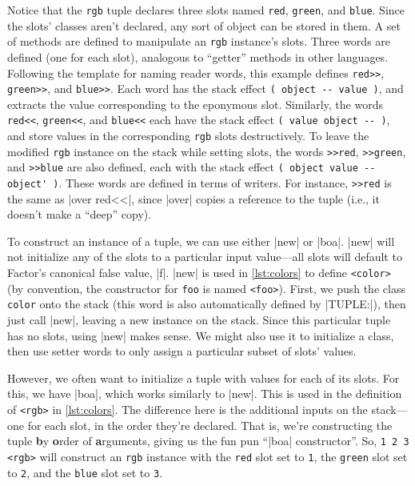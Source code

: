 Notice that the \Verb|rgb| tuple declares three slots named \Verb|red|,
\Verb|green|, and \Verb|blue|.  Since the slots' classes aren't declared,
any sort of object can be stored in them.  A set of methods are defined to
manipulate an \Verb|rgb| instance's slots.  Three  words are
defined (one for each slot), analogous to ``getter'' methods in other
languages.  Following the template for naming reader words, this example
defines \Verb|red>>|, \Verb|green>>|, and \Verb|blue>>|.  Each word has
the stack effect
%
\Verb|( object -- value )|,
%
and extracts the value corresponding to the eponymous slot.  Similarly, the
 words \Verb|red<<|, \Verb|green<<|, and \Verb|blue<<| each
have the stack effect
%
\Verb|( value object -- )|,
%
and store values in the corresponding \Verb|rgb| slots destructively.  To
leave the modified \Verb|rgb| instance on the stack while setting slots, the
 words \Verb|>>red|, \Verb|>>green|, and \Verb|>>blue| are
also defined, each with the stack effect
%
\Verb|( object value -- object' )|.
%
These words are defined in terms of writers.  For instance, \Verb|>>red| is
the same as \factor|over red<<|, since \factor|over| copies a reference to the
tuple (i.e., it doesn't make a ``deep'' copy).

To construct an instance of a tuple, we can use either \factor|new| or
\factor|boa|.  \factor|new| will not initialize any of the slots to a
particular input value---all slots will default to Factor's canonical false
value, \factor|f|.  \factor|new| is used in \vref{lst:colors} to define
\Verb|<color>| (by convention, the constructor for \Verb|foo| is named
\Verb|<foo>|).  First, we push the class \Verb|color| onto the stack (this
word is also automatically defined by \factor|TUPLE:|), then just call
\factor|new|, leaving a new instance on the stack.  Since this particular tuple
has no slots, using \factor|new| makes sense.  We might also use it to
initialize a class, then use setter words to only assign a particular subset of
slots' values.

However, we often want to initialize a tuple with values for each of its slots.
For this, we have \factor|boa|, which works similarly to \factor|new|.  This is
used in the definition of \Verb|<rgb>| in \vref{lst:colors}.  The difference
here is the additional inputs on the stack---one for each slot, in the order
they're declared.  That is, we're constructing the tuple \textbf{b}y
\textbf{o}rder of \textbf{a}rguments, giving us the fun pun ``\factor|boa|
constructor''.  So, \Verb|1 2 3 <rgb>| will construct an \Verb|rgb|
instance with the \Verb|red| slot set to \Verb|1|, the \Verb|green| slot
set to \Verb|2|, and the \Verb|blue| slot set to \Verb|3|.

